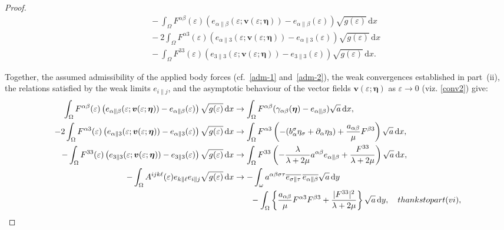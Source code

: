 \documentclass{amsart}
\def\dd{\, \mathrm{d}}
\begin{document}
\begin{proof}
\begin{equation}
\begin{aligned}
	&\quad-\int_{\Omega} F^{\alpha\beta}(\varepsilon) \left(e_{\alpha\|\beta}(\varepsilon;\bm{v}(\varepsilon;\bm{\eta}))-e_{\alpha\|\beta}(\varepsilon)\right) \sqrt{g(\varepsilon)} \dd x\\
	&\quad-2\int_{\Omega} F^{\alpha3}(\varepsilon) \left(e_{\alpha\|3}(\varepsilon;\bm{v}(\varepsilon;\bm{\eta}))-e_{\alpha\|3}(\varepsilon)\right) \sqrt{g(\varepsilon)} \dd x\\
	&\quad-\int_{\Omega} F^{33}(\varepsilon) \left(e_{3\|3}(\varepsilon;\bm{v}(\varepsilon;\bm{\eta}))-e_{3\|3}(\varepsilon)\right) \sqrt{g(\varepsilon)} \dd x.
\end{aligned}
\end{equation}

Together, the assumed admissibility of the applied body forces (cf.~\eqref{adm-1} and~\eqref{adm-2}), the weak convergences established in part~(ii), the relations satisfied by the weak limits $e_{i\|j}$, and the asymptotic behaviour of the vector fields $\bm{v}(\varepsilon;\bm{\eta})$ as $\varepsilon\to 0$ (viz. \eqref{conv2}) give:
\begin{equation*}
	\begin{aligned}
		\int_{\Omega} F^{\alpha\beta}(\varepsilon) \left(e_{\alpha\|\beta}(\varepsilon;\bm{v}(\varepsilon;\bm{\eta}))-e_{\alpha\|\beta}(\varepsilon)\right) \sqrt{g(\varepsilon)} \dd x &\to \int_{\Omega} F^{\alpha\beta} (\gamma_{\alpha\beta}(\bm{\eta}) - e_{\alpha\|\beta}) \sqrt{a} \dd x,\\
		-2\int_{\Omega} F^{\alpha3}(\varepsilon) \left(e_{\alpha\|3}(\varepsilon;\bm{v}(\varepsilon;\bm{\eta}))-e_{\alpha\|3}(\varepsilon)\right) \sqrt{g(\varepsilon)} \dd x &\to \int_{\Omega} F^{\alpha3} \left(-(b_\alpha^\sigma \eta_\sigma+\partial_\alpha\eta_3)+\dfrac{a_{\alpha\beta}}{\mu}F^{\beta3}\right) \sqrt{a} \dd x,\\
		-\int_{\Omega}F^{33}(\varepsilon)\left(e_{3\|3}(\varepsilon;\bm{v}(\varepsilon;\bm{\eta}))-e_{3\|3}(\varepsilon)\right) \sqrt{g(\varepsilon)} \dd x&\to\int_{\Omega}F^{33}\left(-\dfrac{\lambda}{\lambda+2\mu}a^{\alpha\beta} e_{\alpha\|\beta}+\dfrac{F^{33}}{\lambda+2\mu}\right)\sqrt{a} \dd x,\\
		-\int_{\Omega} A^{ijk\ell}(\varepsilon) e_{k\|\ell} e_{i\|j} \sqrt{g(\varepsilon)} \dd x &\to -\int_{\omega} a^{\alpha\beta\sigma\tau} \overline{e_{\sigma\|\tau}}\, \overline{e_{\alpha\|\beta}} \sqrt{a} \dd y\\
		&\qquad-\int_{\Omega} \left\{\dfrac{a_{\alpha\beta}}{\mu}F^{\alpha3} F^{\beta3}+\dfrac{|F^{33}|^2}{\lambda+2\mu}\right\} \sqrt{a} \dd y, \quad\textup{ thanks to part (vi),}\\

\end{aligned}
\end{equation*}
\end{proof}
\end{document}
